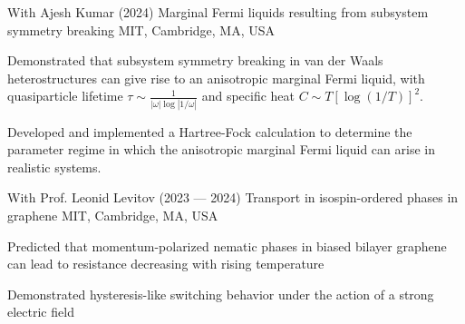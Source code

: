 \begin{cventries}

\cventry
{With Ajesh Kumar (2024)} %
{Marginal Fermi liquids resulting from subsystem symmetry breaking} %
{MIT, Cambridge, MA, USA} %
{} %
{
	\begin{cvitems} %
		\item{Demonstrated that subsystem symmetry breaking in van der Waals heterostructures can give rise to an anisotropic marginal Fermi liquid, with quasiparticle lifetime $\tau \sim \frac{1}{|\omega|\log|1/\omega|}$ and specific heat $C \sim T [\log(1/T)]^2$.}
		\item{Developed and implemented a Hartree-Fock calculation to determine the parameter regime in which the anisotropic marginal Fermi liquid can arise in realistic systems.}
	\end{cvitems}
}

\cventry
{With Prof. Leonid Levitov (2023 --- 2024)} %
{Transport in isospin-ordered phases in graphene} %
{MIT, Cambridge, MA, USA} %
{} %
{
	\begin{cvitems} %
		\item{Predicted that momentum-polarized nematic phases in biased bilayer graphene can lead to resistance decreasing with rising temperature}
		\item{Demonstrated hysteresis-like switching behavior under the action of a strong electric field}
	\end{cvitems}
}


\end{cventries}
